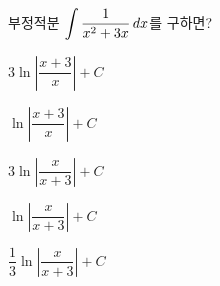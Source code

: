 부정적분 $\displaystyle\int\dfrac{1}{x^2+3x}\mkern3mu dx$를 구하면? 
\begin{choicesii}{\rule[-3ex]{0pt}{8ex}$3\ln\left|\dfrac{x+3}{x}\right|+C$}{\rule[-3ex]{0pt}{8ex}$\ln\left|\dfrac{x+3}{x}\right|+C$}{\rule[-3ex]{0pt}{8ex}$3\ln\left|\dfrac{x}{x+3}\right|+C$}{\rule[-3ex]{0pt}{8ex}$\ln\left|\dfrac{x}{x+3}\right|+C$}{\rule[-3ex]{0pt}{8ex}$\dfrac{1}{3}\ln\left|\dfrac{x}{x+3}\right|+C$}\end{choicesii}
